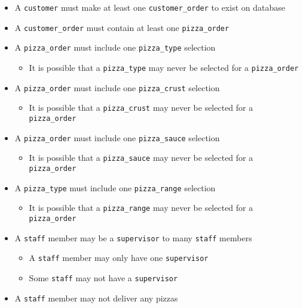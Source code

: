\begin{itemize}
\item A \texttt{customer} must make at least one \texttt{customer_order} to exist on database
\item A \texttt{customer_order} must contain at least one \texttt{pizza_order}
\item A \texttt{pizza_order} must include one \texttt{pizza_type} selection
	\begin{itemize}
	\item It is possible that a \texttt{pizza_type} may never be selected for a \texttt{pizza_order}
	\end{itemize}
\item A \texttt{pizza_order} must include one \texttt{pizza_crust} selection
	\begin{itemize}
	\item It is possible that a \texttt{pizza_crust} may never be selected for a \texttt{pizza_order}
	\end{itemize}
\item A \texttt{pizza_order} must include one \texttt{pizza_sauce} selection
	\begin{itemize}
	\item It is possible that a \texttt{pizza_sauce} may never be selected for a \texttt{pizza_order}
	\end{itemize}
\item A \texttt{pizza_type} must include one \texttt{pizza_range} selection
	\begin{itemize}
	\item It is possible that a \texttt{pizza_range} may never be selected for a \texttt{pizza_order}
	\end{itemize}
\item A \texttt{staff} member may be a \texttt{supervisor} to many \texttt{staff} members
	\begin{itemize}
	\item A \texttt{staff} member may only have one \texttt{supervisor}
	\item Some \texttt{staff} may not have a \texttt{supervisor}
	\end{itemize}
\item A \texttt{staff} member may not deliver any pizzas
\end{itemize}

